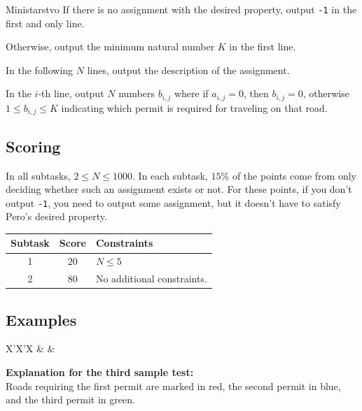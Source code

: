 \begin{statement}[
  problempoints=100,
  timelimit=1 second,
  memorylimit=1024 MiB,
]{Ministarstvo}
If there is no assignment with the desired property, output \texttt{-1} in the first and only line.

Otherwise, output the minimum natural number $K$ in the first line.

In the following $N$ lines, output the description of the assignment.

In the $i$-th line, output $N$ numbers $b_{i, j}$ where if $a_{i, j} = 0$, then $b_{i, j} = 0$, otherwise $1 \leq b_{i, j} \leq K$ indicating which permit is required for traveling on that road. 

\subsection*{Scoring}

In all subtasks, $2 \leq N \leq 1000$. In each subtask, $15\%$ of the points come from only deciding whether such an assignment exists or not. For these points, if you don't output \texttt{-1}, you need to output some assignment, but it doesn't have to satisfy Pero's desired property. 

{\renewcommand{\arraystretch}{1.4}
  \setlength{\tabcolsep}{6pt}
  \begin{tabular}{ccl}
   Subtask & Score & Constraints \\ \midrule
    1 & 20 & $N \leq 5$  \\
    2 & 80 & No additional constraints. \\
\end{tabular}}

\subsection*{Examples}
\begin{tabularx}{\textwidth}{X'X'X}
 &
 &
\end{tabularx}

\textbf{Explanation for the third sample test:}\\

Roads requiring the first permit are marked in red, the second permit in blue, and the third permit in green.


\end{statement}
